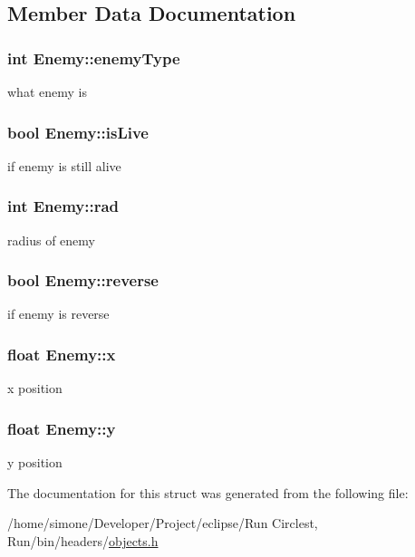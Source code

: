 \subsection{Member Data Documentation}
\hypertarget{struct_enemy_ac63693289c1945d49cbf360aa604ab02}{
\subsubsection[{enemy\-Type}]{\setlength{\rightskip}{0pt plus 5cm}int Enemy\-::enemy\-Type}}\label{struct_enemy_ac63693289c1945d49cbf360aa604ab02}
what enemy is \hypertarget{struct_enemy_af6cf896248bf6e7fc3468781a17e0a98}{
\subsubsection[{is\-Live}]{\setlength{\rightskip}{0pt plus 5cm}bool Enemy\-::is\-Live}}\label{struct_enemy_af6cf896248bf6e7fc3468781a17e0a98}
if enemy is still alive \hypertarget{struct_enemy_a6527a7e8701f98e3fb353dfbbc138bde}{
\subsubsection[{rad}]{\setlength{\rightskip}{0pt plus 5cm}int Enemy\-::rad}}\label{struct_enemy_a6527a7e8701f98e3fb353dfbbc138bde}
radius of enemy \hypertarget{struct_enemy_a6184ea9e648f99f55e2f3b80a26370eb}{
\subsubsection[{reverse}]{\setlength{\rightskip}{0pt plus 5cm}bool Enemy\-::reverse}}\label{struct_enemy_a6184ea9e648f99f55e2f3b80a26370eb}
if enemy is reverse \hypertarget{struct_enemy_a9b45f57b3d7474400108f09587df67b0}{
\subsubsection[{x}]{\setlength{\rightskip}{0pt plus 5cm}float Enemy\-::x}}\label{struct_enemy_a9b45f57b3d7474400108f09587df67b0}
x position \hypertarget{struct_enemy_aa7d03269f81e619c117ce49f40f53eef}{
\subsubsection[{y}]{\setlength{\rightskip}{0pt plus 5cm}float Enemy\-::y}}\label{struct_enemy_aa7d03269f81e619c117ce49f40f53eef}
y position 

The documentation for this struct was generated from the following file\-:\begin{DoxyCompactItemize}
\item 
/home/simone/\-Developer/\-Project/eclipse/\-Run Circlest, Run/bin/headers/\hyperlink{objects_8h}{objects.\-h}\end{DoxyCompactItemize}
